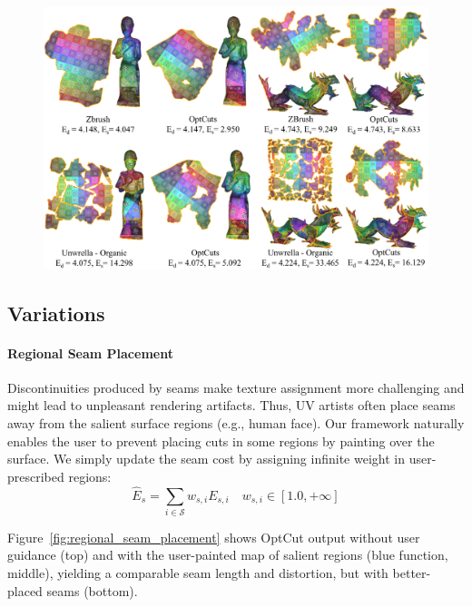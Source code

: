 \begin{figure}[t]
\centering
\includegraphics[width=\linewidth]{fig/comp_commercial.png}
\caption{}
\label{fig:comp_commercial}
\end{figure}


\subsection{Variations}

\paragraph{Regional Seam Placement}
Discontinuities produced by seams make texture assignment more challenging and might lead to unpleasant rendering artifacts. Thus, UV artists often place seams away from the salient surface regions (e.g., human face). Our framework naturally enables the user to prevent placing cuts in some regions by painting over the surface.  We simply update the seam cost by assigning infinite weight in user-prescribed regions:
\[ \hat{E}_{s} = \sum_{i\in\mathcal{S}} w_{s,i} E_{s,i} \quad w_{s,i} \in [1.0, +\infty] \]

Figure~\ref{fig:regional_seam_placement} shows OptCut output without user guidance (top) and with the user-painted map of salient regions (blue function, middle), yielding a comparable seam length and distortion, but with better-placed seams (bottom). 
%



